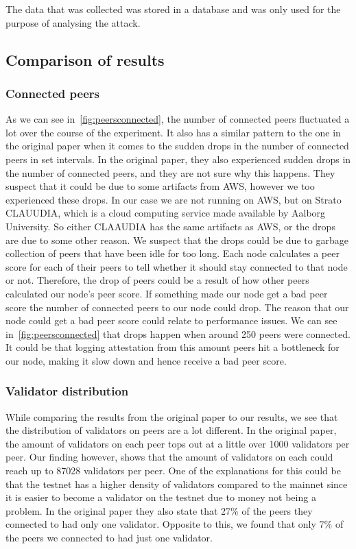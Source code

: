 The data that was collected was stored in a database and was only used for the purpose of analysing the attack.

\subsection{Comparison of results}\label{subsec:res-comparison}

\subsubsection{Connected peers}\label{subsubsec:connected-peers}
As we can see in~\autoref{fig:peersconnected}, the number of connected peers fluctuated a lot over the course of the experiment.
It also has a similar pattern to the one in the original paper when it comes to the sudden drops in the number of connected peers in set intervals.
In the original paper, they also experienced sudden drops in the number of connected peers, and they are not sure why this happens.
They suspect that it could be due to some artifacts from AWS, however we too experienced these drops.
In our case we are not running on AWS, but on Strato CLAUUDIA, which is a cloud computing service made available by Aalborg University.
So either CLAAUDIA has the same artifacts as AWS, or the drops are due to some other reason.
We suspect that the drops could be due to garbage collection of peers that have been idle for too long.
Each node calculates a peer score for each of their peers to tell whether it should stay connected to that node or not.
Therefore, the drop of peers could be a result of how other peers calculated our node's peer score.
If something made our node get a bad peer score the number of connected peers to our node could drop.
The reason that our node could get a bad peer score could relate to performance issues.
We can see in~\autoref{fig:peersconnected} that drops happen when around 250 peers were connected.
It could be that logging attestation from this amount peers hit a bottleneck for our node, making it slow down and hence receive a bad peer score.


\subsubsection{Validator distribution}\label{subsubsec:validator-distribution}
While comparing the results from the original paper to our results, we see that the distribution of validators on peers are a lot different.
In the original paper, the amount of validators on each peer tops out at a little over 1000 validators per peer.
Our finding however, shows that the amount of validators on each could reach up to 87028 validators per peer.
One of the explanations for this could be that the testnet has a higher density of validators compared to the mainnet since it is easier to become a validator on the testnet due to money not being a problem.
In the original paper they also state that 27\% of the peers they connected to had only one validator.
Opposite to this, we found that only 7\% of the peers we connected to had just one validator.

